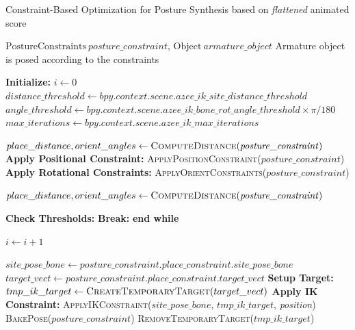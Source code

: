 \documentclass[../../main.tex]{subfiles}
\begin{document}
\begin{algorithm}
    \caption{Constraint-Based Optimization for Posture Synthesis based on \emph{flattened} animated score}
    \label{alg:old_constraint_based_optimization}
    \begin{algorithmic}[1]
    \Require $\text{PostureConstraints} \ \mathit{posture\_constraint}$, $\text{Object} \ \mathit{armature\_object}$
    \Ensure Armature object is posed according to the constraints
    
    \State \textbf{Initialize:} $i \gets 0$
    \State $distance\_threshold \gets \mathit{bpy.context.scene.azee\_ik\_site\_distance\_threshold}$
    \State $angle\_threshold \gets \mathit{bpy.context.scene.azee\_ik\_bone\_rot\_angle\_threshold \times \pi / 180}$
    \State $max\_iterations \gets \mathit{bpy.context.scene.azee\_ik\_max\_iterations}$
    
    \State $place\_distance, orient\_angles \gets \textsc{ComputeDistance}(\mathit{posture\_constraint})$
        \State \textbf{Apply Positional Constraint:} \textsc{ApplyPositionConstraint}($\mathit{posture\_constraint}$)
        \State \textbf{Apply Rotational Constraints:} \textsc{ApplyOrientConstraints}($\mathit{posture\_constraint}$)
        
        \State $place\_distance, orient\_angles \gets \textsc{ComputeDistance}(\mathit{posture\_constraint})$
        
        \State \textbf{Check Thresholds:}
            \State \textbf{Break:} \textbf{end while}
        \EndIf
        
        \State $i \gets i + 1$
    \EndWhile
    
            \State $site\_pose\_bone \gets \mathit{posture\_constraint.place\_constraint.site\_pose\_bone}$
            \State $target\_vect \gets \mathit{posture\_constraint.place\_constraint.target\_vect}$
            \State \textbf{Setup Target:} $tmp\_ik\_target \gets \textsc{CreateTemporaryTarget}(target\_vect)$
            \State \textbf{Apply IK Constraint:} \textsc{ApplyIKConstraint}($site\_pose\_bone$, $tmp\_ik\_target$, \textit{position})
            \State \textsc{BakePose}($\mathit{posture\_constraint}$)
            \State \textsc{RemoveTemporaryTarget}($tmp\_ik\_target$)
        \EndIf
    \EndProcedure
    

\end{algorithmic}
\end{algorithm}
\end{document}
